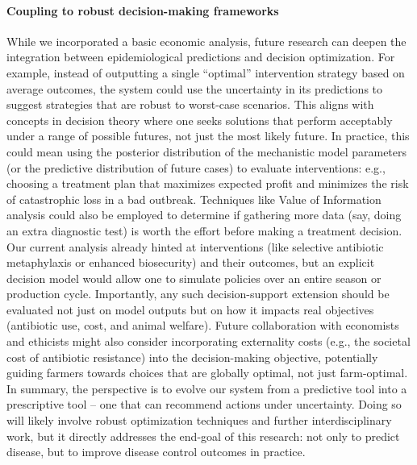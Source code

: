 \paragraph{Coupling to robust decision-making frameworks} While we incorporated a basic economic analysis, future research can deepen the integration between epidemiological predictions and decision optimization. For example, instead of outputting a single “optimal” intervention strategy based on average outcomes, the system could use the uncertainty in its predictions to suggest strategies that are robust to worst-case scenarios. This aligns with concepts in decision theory where one seeks solutions that perform acceptably under a range of possible futures, not just the most likely future. In practice, this could mean using the posterior distribution of the mechanistic model parameters (or the predictive distribution of future cases) to evaluate interventions: e.g., choosing a treatment plan that maximizes expected profit and minimizes the risk of catastrophic loss in a bad outbreak. Techniques like Value of Information analysis could also be employed to determine if gathering more data (say, doing an extra diagnostic test) is worth the effort before making a treatment decision. Our current analysis already hinted at interventions (like selective antibiotic metaphylaxis or enhanced biosecurity) and their outcomes, but an explicit decision model would allow one to simulate policies over an entire season or production cycle. Importantly, any such decision-support extension should be evaluated not just on model outputs but on how it impacts real objectives (antibiotic use, cost, and animal welfare). Future collaboration with economists and ethicists might also consider incorporating externality costs (e.g., the societal cost of antibiotic resistance) into the decision-making objective, potentially guiding farmers towards choices that are globally optimal, not just farm-optimal. In summary, the perspective is to evolve our system from a predictive tool into a prescriptive tool – one that can recommend actions under uncertainty. Doing so will likely involve robust optimization techniques and further interdisciplinary work, but it directly addresses the end-goal of this research: not only to predict disease, but to improve disease control outcomes in practice.

